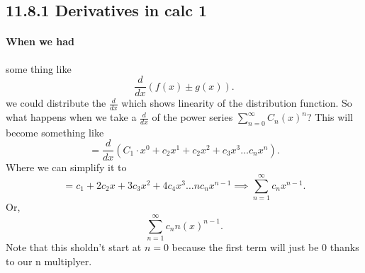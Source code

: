 \subsection*{11.8.1 Derivatives in calc 1}%
\label{sub:11.8.1 Derivatives in calc 1}
\paragraph{When we had} some thing like \[
\frac{ d }{ dx } \left( f\left( x \right) \pm g\left( x \right)  \right) 
.\] 
we could distribute the $ \frac{ d }{ dx }  $ which shows linearity of the distribution function. So what happens when we take a $ \frac{ d }{ dx }  $ of the power series $ \sum_{ n=0 } ^{ \infty } C_n \left( x \right) ^{ n } $? This will become something like
\[
=\frac{ d }{ dx } \left( C_1 \cdot x^{ 0 }+c_2x^{ 1 }+c_2x^2+c_3x^3 \ldots c_nx^{ n }\right) 
.\] 
Where we can simplify it to 
\[
= c_1+2c_2x+3c_3x^2+4c_4x^3 \ldots nc_nx^{ n-1 } \implies \sum_{ n=1 } ^{ \infty } c_nx^{ n-1 }
.\] 
Or,
\[
\sum_{ n=1 } ^{ \infty } c_nn\left( x \right) ^{ n-1 }
.\] 
Note that this sholdn't start at $ n=0 $ because the first term will just be 0 thanks to our n multiplyer. 
